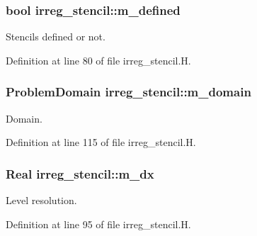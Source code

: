 \subsubsection[{\texorpdfstring{m\+\_\+defined}{m_defined}}]{\setlength{\rightskip}{0pt plus 5cm}bool irreg\+\_\+stencil\+::m\+\_\+defined\hspace{0.3cm}{\ttfamily [protected]}}\hypertarget{classirreg__stencil_a36f61642f0fb4f1d4e645a7c45965dc8}{}\label{classirreg__stencil_a36f61642f0fb4f1d4e645a7c45965dc8}


Stencils defined or not. 



Definition at line 80 of file irreg\+\_\+stencil.\+H.

\subsubsection[{\texorpdfstring{m\+\_\+domain}{m_domain}}]{\setlength{\rightskip}{0pt plus 5cm}Problem\+Domain irreg\+\_\+stencil\+::m\+\_\+domain\hspace{0.3cm}{\ttfamily [protected]}}\hypertarget{classirreg__stencil_a55c882eb6a84dadfa76c97e3482c2cb4}{}\label{classirreg__stencil_a55c882eb6a84dadfa76c97e3482c2cb4}


Domain. 



Definition at line 115 of file irreg\+\_\+stencil.\+H.

\subsubsection[{\texorpdfstring{m\+\_\+dx}{m_dx}}]{\setlength{\rightskip}{0pt plus 5cm}Real irreg\+\_\+stencil\+::m\+\_\+dx\hspace{0.3cm}{\ttfamily [protected]}}\hypertarget{classirreg__stencil_a293968e88c731142a799cd09751ded7c}{}\label{classirreg__stencil_a293968e88c731142a799cd09751ded7c}


Level resolution. 



Definition at line 95 of file irreg\+\_\+stencil.\+H.

